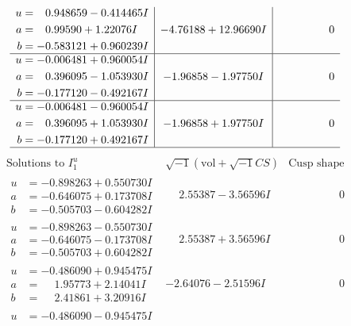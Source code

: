 \documentclass[1p]{elsarticle_modified}
\theoremstyle{definition}
\newcommand{\I}{\sqrt{-1}}
\begin{document}
$$\begin{array}{c|c|c}
\begin{aligned}
u &= \phantom{-}0.948659 - 0.414465 I \\
a &= \phantom{-}0.99590 + 1.22076 I \\
b &= -0.583121 + 0.960239 I\end{aligned}
 & -4.76188 + 12.96690 I & \phantom{-0.000000 } 0 \\ \hline\begin{aligned}
u &= -0.006481 + 0.960054 I \\
a &= \phantom{-}0.396095 - 1.053930 I \\
b &= -0.177120 - 0.492167 I\end{aligned}
 & -1.96858 - 1.97750 I & \phantom{-0.000000 } 0 \\ \hline\begin{aligned}
u &= -0.006481 - 0.960054 I \\
a &= \phantom{-}0.396095 + 1.053930 I \\
b &= -0.177120 + 0.492167 I\end{aligned}
 & -1.96858 + 1.97750 I & \phantom{-0.000000 } 0\\
 \hline 
 \end{array}$$\newpage$$\begin{array}{c|c|c}  
\text{Solutions to }I^u_{1}& \I (\text{vol} + \sqrt{-1}CS) & \text{Cusp shape}\\
 \hline 
\begin{aligned}
u &= -0.898263 + 0.550730 I \\
a &= -0.646075 + 0.173708 I \\
b &= -0.505703 - 0.604282 I\end{aligned}
 & \phantom{-}2.55387 - 3.56596 I & \phantom{-0.000000 } 0 \\ \hline\begin{aligned}
u &= -0.898263 - 0.550730 I \\
a &= -0.646075 - 0.173708 I \\
b &= -0.505703 + 0.604282 I\end{aligned}
 & \phantom{-}2.55387 + 3.56596 I & \phantom{-0.000000 } 0 \\ \hline\begin{aligned}
u &= -0.486090 + 0.945475 I \\
a &= \phantom{-}1.95773 + 2.14041 I \\
b &= \phantom{-}2.41861 + 3.20916 I\end{aligned}
 & -2.64076 - 2.51596 I & \phantom{-0.000000 } 0 \\ \hline\begin{aligned}
u &= -0.486090 - 0.945475 I \\

\end{aligned}
\end{array}$$
\end{document}
